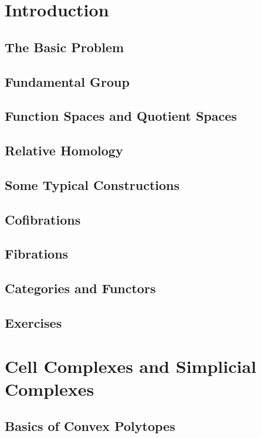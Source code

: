 \section{Introduction}

\subsection{The Basic Problem} 

\subsection{Fundamental Group}

\subsection{Function Spaces and Quotient Spaces}

\subsection{Relative Homology}

\subsection{Some Typical Constructions}

\subsection{Cofibrations}

\subsection{Fibrations}

\subsection{Categories and Functors}

\subsection{Exercises}

\section{Cell Complexes and Simplicial Complexes}

\subsection{Basics of Convex Polytopes}

